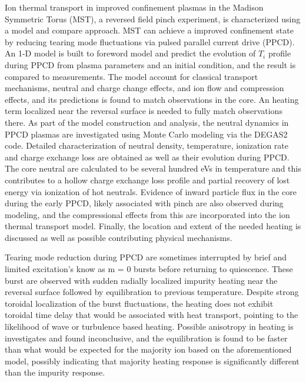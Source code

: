 
Ion thermal transport in improved confinement plasmas in the Madison Symmetric Torus (MST), a reversed field pinch experiment, is characterized using a model and compare approach. MST can achieve a improved confinement state by reducing tearing mode fluctuations via pulsed parallel current drive (PPCD). An 1-D model is built to foreword model and predict the evolution of $T_i$ profile during PPCD from plasma parameters and an initial condition, and the result is compared to measurements. The model account for classical transport mechanisms, neutral and charge change effects, and ion flow and compression effects, and its predictions is found to match observations in the core. An \adhoc heating term localized near the reversal surface is needed to fully match observations there. As part of the model construction and analysis, the neutral dynamics in PPCD plasmas are investigated using Monte Carlo modeling via the DEGAS2 code. Detailed characterization of neutral density, temperature, ionization rate and charge exchange loss are obtained as well as their evolution during PPCD. The core neutral are calculated to be several hundred eVs in temperature and this contributes to a hollow charge exchange loss profile and partial recovery of lost energy via ionization of hot neutrals. Evidence of inward particle flux in the core during the early PPCD, likely associated with \ecb pinch are also observed during modeling, and the compressional effects from this \ecb are incorporated into the ion thermal transport model. Finally, the location and extent of the needed \adhoc heating is discussed as well as possible contributing physical mechanisms.

Tearing mode reduction during PPCD are sometimes interrupted by brief and limited excitation's know as m = 0 bursts before returning to quiescence. These burst are observed with sudden radially localized impurity heating near the reversal surface followed by equilibration to previous temperature. Despite strong toroidal localization of the burst fluctuations, the heating does not exhibit toroidal time delay that would be associated with heat transport, pointing to the likelihood of wave or turbulence based heating. Possible anisotropy in heating is investigates and found inconclusive, and the equilibration is found to be faster than what would be expected for the majority ion based on the aforementioned model, possibly indicating that majority heating response is significantly different than the impurity response.
